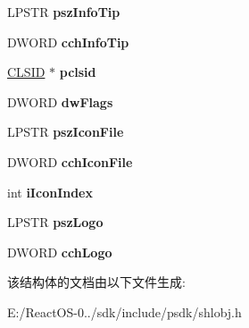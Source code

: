 \begin{DoxyCompactItemize}
L\+P\+S\+TR {\bfseries psz\+Info\+Tip}
\item 
\mbox{\label{struct_s_h_f_o_l_d_e_r_c_u_s_t_o_m_s_e_t_t_i_n_g_s_a_adec69206967917a3ce094a909b867a9f}} 
D\+W\+O\+RD {\bfseries cch\+Info\+Tip}
\item 
\mbox{\label{struct_s_h_f_o_l_d_e_r_c_u_s_t_o_m_s_e_t_t_i_n_g_s_a_a1e10d35a402f43799dd34d2f887086c1}} 
\hyperlink{struct___i_i_d}{C\+L\+S\+ID} $\ast$ {\bfseries pclsid}
\item 
\mbox{\label{struct_s_h_f_o_l_d_e_r_c_u_s_t_o_m_s_e_t_t_i_n_g_s_a_a717eb14c8e00e7ee75ec9c38fcad6bae}} 
D\+W\+O\+RD {\bfseries dw\+Flags}
\item 
\mbox{\label{struct_s_h_f_o_l_d_e_r_c_u_s_t_o_m_s_e_t_t_i_n_g_s_a_ae8ae597de7b98d795fe8c068f070b7f1}} 
L\+P\+S\+TR {\bfseries psz\+Icon\+File}
\item 
\mbox{\label{struct_s_h_f_o_l_d_e_r_c_u_s_t_o_m_s_e_t_t_i_n_g_s_a_a5b4a4a9e8420ed6047e908c2e53b70a8}} 
D\+W\+O\+RD {\bfseries cch\+Icon\+File}
\item 
\mbox{\label{struct_s_h_f_o_l_d_e_r_c_u_s_t_o_m_s_e_t_t_i_n_g_s_a_a7a238896737866d25a141d01ebab25fe}} 
int {\bfseries i\+Icon\+Index}
\item 
\mbox{\label{struct_s_h_f_o_l_d_e_r_c_u_s_t_o_m_s_e_t_t_i_n_g_s_a_a19dfe6c30656ae95148248787c1edb69}} 
L\+P\+S\+TR {\bfseries psz\+Logo}
\item 
\mbox{\label{struct_s_h_f_o_l_d_e_r_c_u_s_t_o_m_s_e_t_t_i_n_g_s_a_a3cfd879d439b909a46694dee4363092a}} 
D\+W\+O\+RD {\bfseries cch\+Logo}
\end{DoxyCompactItemize}


该结构体的文档由以下文件生成\+:\begin{DoxyCompactItemize}
\item 
E\+:/\+React\+O\+S-\/0../sdk/include/psdk/shlobj.\+h\end{DoxyCompactItemize}
